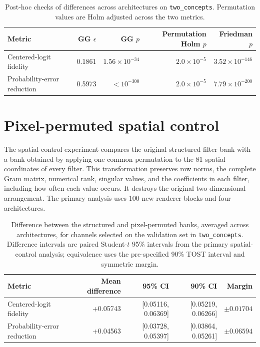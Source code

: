 \documentclass[pdflatex,sn-basic]{sn-jnl}
\begin{document}
\begin{table}[h]
\caption{Post-hoc checks of differences across architectures on \texttt{two\_concepts}. Permutation values are Holm adjusted across the two metrics.}
\label{tab:supp-architecture-robustness}
\centering
\footnotesize
\begin{tabular}{lrrrr}
\toprule
Metric & GG $\epsilon$ & GG $p$ & Permutation Holm $p$ & Friedman $p$ \\
\midrule
Centered-logit fidelity & 0.1861 & $1.56\times10^{-34}$ & $2.0\times10^{-5}$ & $3.52\times10^{-146}$ \\
Probability-error reduction & 0.5973 & $<10^{-300}$ & $2.0\times10^{-5}$ & $7.79\times10^{-200}$ \\
\bottomrule
\end{tabular}
\end{table}

\section{Pixel-permuted spatial control}\label{supp:spatial}

The spatial-control experiment compares the original structured filter bank with a bank obtained by applying one common permutation to the 81 spatial coordinates of every filter. This transformation preserves row norms, the complete Gram matrix, numerical rank, singular values, and the coefficients in each filter, including how often each value occurs. It destroys the original two-dimensional arrangement. The primary analysis uses 100 new renderer blocks and four architectures.

\begin{table}[h]
\caption{Difference between the structured and pixel-permuted banks, averaged across architectures, for channels selected on the validation set in \texttt{two\_concepts}. Difference intervals are paired Student-$t$ 95\% intervals from the primary spatial-control analysis; equivalence uses the pre-specified 90\% TOST interval and symmetric margin.}
\label{tab:supp-spatial-primary}
\centering
\footnotesize
\begin{tabular}{lrrrr}
\toprule
Metric & Mean difference & 95\% CI & 90\% CI & Margin \\
\midrule
Centered-logit fidelity & +0.05743 & [0.05116, 0.06369] & [0.05219, 0.06266] & $\pm0.01704$ \\
Probability-error reduction & +0.04563 & [0.03728, 0.05397] & [0.03864, 0.05261] & $\pm0.06594$ \\
\bottomrule
\end{tabular}
\end{table}
\end{document}
